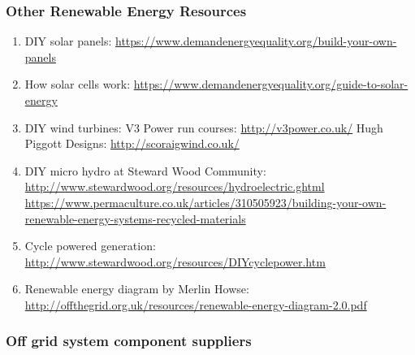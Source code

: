 \documentclass{article}
\theoremstyle{definition}
\theoremstyle{definition}
\theoremstyle{remark}
\begin{document}

  \subsubsection{Other Renewable Energy Resources} %
  \label{ssub:other_renewable_energy_resources}
  
    \begin{enumerate}[resume]
      \item DIY solar panels: \href{https://www.demandenergyequality.org/build-your-own-panels}{https://www.demandenergyequality.org/build-your-own-panels}
      \item How solar cells work: \href{https://www.demandenergyequality.org/guide-to-solar-energy}{https://www.demandenergyequality.org/guide-to-solar-energy}
      \item DIY wind turbines: \newline
      V3 Power run courses: \href{http://v3power.co.uk/}{http://v3power.co.uk/} \newline
      Hugh Piggott Designs: \href{http://scoraigwind.co.uk/}{http://scoraigwind.co.uk/}
      \item DIY micro hydro at Steward Wood Community: \newline
      \href{http://www.stewardwood.org/resources/hydroelectric.ghtml}{http://www.stewardwood.org/resources/hydroelectric.ghtml} \newline
      \href{https://www.permaculture.co.uk/articles/310505923/building-your-own-renewable-energy-systems-recycled-materials}{https://www.permaculture.co.uk/articles/310505923/building-your-own-renewable-energy-systems-recycled-materials}
      \item Cycle powered generation: \href{http://www.stewardwood.org/resources/DIYcyclepower.htm}{http://www.stewardwood.org/resources/DIYcyclepower.htm}
      \item Renewable energy diagram by Merlin Howse: \newline
      \href{http://offthegrid.org.uk/resources/renewable-energy-diagram-2.0.pdf}{http://offthegrid.org.uk/resources/renewable-energy-diagram-2.0.pdf}
    \end{enumerate}



  \subsubsection{Off grid system component suppliers} %
  \label{ssub:off_grid_system_component_suppliers}
\end{document}
